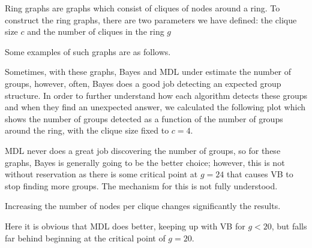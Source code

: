Ring graphs are graphs which consist of cliques of nodes around a ring. To
construct the ring graphs, there are two parameters we have defined: the clique
size $c$ and the number of cliques in the ring $g$

Some examples of such graphs are as follows.

\begin{minipage}{\linewidth}




\end{minipage}

Sometimes, with these graphs, Bayes and MDL under estimate the number of
groups, however, often, Bayes does a good job detecting an expected group
structure. In order to further understand how each algorithm detects
these groups and when they find an unexpected answer, we calculated the
following plot which shows the number of groups detected as a function of
the number of groups around the ring, with the clique size fixed to
$c=4$.

\begin{minipage}{\linewidth}

\end{minipage}

MDL never does a great job discovering the number of groups, so for these
graphs, Bayes is generally going to be the better choice; however, this
is not without reservation as there is some critical point at $g=24$ that
causes VB to stop finding more groups. The mechanism for this is not fully
understood.

Increasing the number of nodes per clique changes significantly the
results.

\begin{minipage}{\linewidth}

\end{minipage}

Here it is obvious that MDL does better, keeping up with VB for $g < 20$,
but falls far behind beginning at the critical point of $g=20$.

